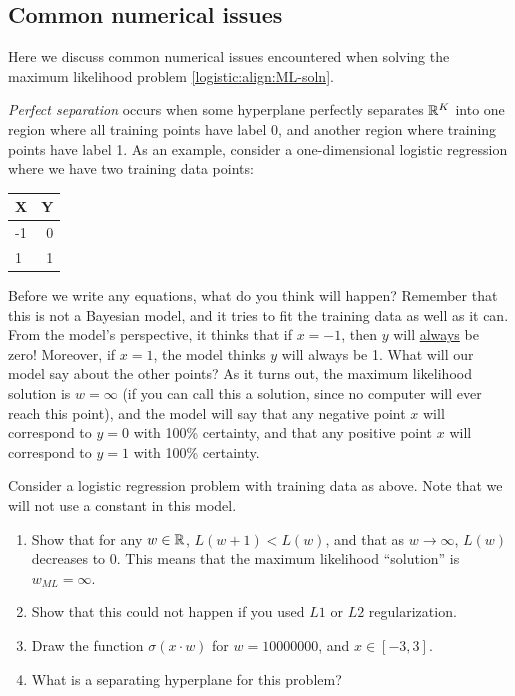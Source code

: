\subsection{Common numerical issues}
Here we discuss common numerical issues encountered when solving the maximum likelihood problem \eqref{logistic:align:ML-soln}.

\emph{Perfect separation} occurs when some hyperplane perfectly separates ${\mathbb R}^K$ into one region where all training points have label 0, and another region where training points have label 1.  As an example, consider a one-dimensional logistic regression where we have two training data points:

\begin{tabular}{|l|r|}
  \hline
  X & Y \\
  \hline
  -1 & 0 \\
  \hline
  1 & 1 \\
  \hline
\end{tabular}

Before we write any equations, what do you think will happen?  Remember that this is not a Bayesian model, and it tries to fit the training data as well as it can.  From the model's perspective, it thinks that if $x=-1$, then $y$ will \underline{always} be zero!  Moreover, if $x=1$, the model thinks $y$ will always be 1.  What will our model say about the other points?  As it turns out, the maximum likelihood solution is $w=\infty$ (if you can call this a solution, since no computer will ever reach this point), and the model will say that any negative point $x$ will correspond to $y=0$ with 100\% certainty, and that any positive point $x$ will correspond to $y=1$ with 100\% certainty.
\begin{exercise}
  Consider a logistic regression problem with training data as above.  Note that we will not use a constant in this model.  
  \begin{enumerate}
    \item Show that for any $w\in{\mathbb R}$, $L(w+1)< L(w)$, and that as $w\to\infty$, $L(w)$ decreases to $0$.  This means that the maximum likelihood ``solution'' is $w_{ML}=\infty$.
    \item Show that this could not happen if you used $L1$ or $L2$ regularization.
    \item Draw the function $\sigma(x\cdot w)$ for $w = 10000000$, and $x\in[-3, 3]$.
    \item What is a separating hyperplane for this problem?
  \end{enumerate}
\end{exercise}

